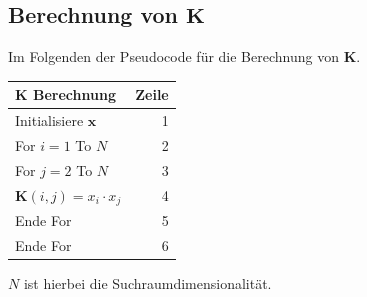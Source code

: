 \documentclass[a4paper,11pt,twoside]{scrreprt}
\begin{document}
\subsection{Berechnung von $\mathbf{K}$}\label{subsec:k_ber}
Im Folgenden der Pseudocode für die Berechnung von $\mathbf{K}$.
\begin{table}[H]\label{knokernel}
    \begin{tabular}{|l r|}
        \hline
        $\mathbf{K}$ \textbf{Berechnung} & \textbf{Zeile} \\
        \hline
        Initialisiere $\mathbf{x}$ & 1 \\
        For $i=1$ To $N$ & 2 \\
        \quad For $j=2$ To $N$ & 3 \\
        \quad\quad $\mathbf{K}\left( i, j \right) = x_{i} \cdot x_{j}$ & 4 \\
        \quad Ende For & 5 \\
        Ende For & 6 \\
        \hline
    \end{tabular}
\end{table}

$N$ ist hierbei die Suchraumdimensionalität.
\end{document}
